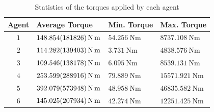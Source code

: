 \begin{table}[ht]
    \centering
    \caption{Statistics of the torques applied by each agent}\label{tb:torques}
    \begin{tabular}{clll}
    Agent & Average Torque & Min. Torque & Max. Torque\\\hline
    $1$ & $\qty{148.854 \pm 181.826}{\newton\meter}$ & $\qty{54.256}{\newton\meter}$ & $\qty{8737.108}{\newton\meter}$\\
    $2$ & $\qty{114.282 \pm 139.403}{\newton\meter}$ & $\qty{3.731}{\newton\meter}$ & $\qty{4838.576}{\newton\meter}$\\
    $3$ & $\qty{109.546 \pm 138.178}{\newton\meter}$ & $\qty{6.095}{\newton\meter}$ & $\qty{8539.131}{\newton\meter}$\\
    $4$ & $\qty{253.599 \pm 288.916}{\newton\meter}$ & $\qty{79.889}{\newton\meter}$ & $\qty{15571.921}{\newton\meter}$\\
    $5$ & $\qty{392.079 \pm 573.948}{\newton\meter}$ & $\qty{48.958}{\newton\meter}$ & $\qty{46835.582}{\newton\meter}$\\
    $6$ & $\qty{145.025 \pm 207.934}{\newton\meter}$ & $\qty{42.274}{\newton\meter}$ & $\qty{12251.425}{\newton\meter}$
    \\\hline
    \end{tabular}
\end{table}